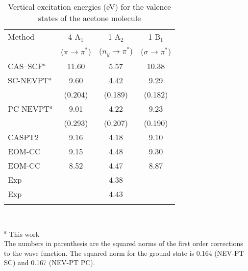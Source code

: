 \documentclass[global,referee]{svjour}
\newcommand{\pipis}{$\!\pi\!\!\rightarrow\!\! \pi^*$}
\newcommand{\sipis}{$\!\sigma\!\!\rightarrow\!\! \pi^*$}
\begin{document}
\clearpage
\newpage
\begin{table}[h]
\caption{Vertical excitation energies (eV) for the valence states of
the acetone molecule}
\label{Tabaceeeval}
\begin{tabular}{lccc}
\hline\noalign{\smallskip}
Method &4 A$_1$ & 1 A$_2$ & 1 B$_1$ \\
 & (\pipis) & ($n_y\rightarrow\pi^*$) & (\sipis) \\
\noalign{\smallskip}\hline\noalign{\smallskip}
CAS--SCF$^a$             & 11.60  & 5.57  &10.38 \\
SC-NEVPT$^a$           &  9.60  & 4.42  & 9.29 \\
                       & (0.204)&(0.189)&(0.182)\\
PC-NEVPT$^a$           &  9.01  & 4.22  & 9.23 \\
                       & (0.293)&(0.207)&(0.190)\\
CASPT2 \cite{Merch96}  &  9.16  & 4.18  & 9.10 \\
EOM-CC \cite{gwalt95}  &  9.15  & 4.48  & 9.30 \\
EOM-CC \cite{Wiberg02} &  8.52  & 4.47  & 8.87 \\
Exp \cite{Walzl87}     &        & 4.38  &      \\
Exp \cite{Robin85}     &        & 4.43  &      \\
\noalign{\smallskip}\hline
\end{tabular}\\
{\smallskip}

$^a$  This work\\
The numbers in parenthesis are the squared norms of the first order 
corrections to the wave function. The squared
norm for the ground state is 0.164 (NEV-PT SC) and 0.167 (NEV-PT PC).
\end{table}
\end{document}
